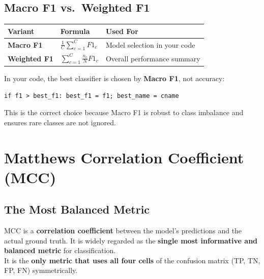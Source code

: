 \documentclass[12pt, a4paper]{article}
\begin{document}
\subsection{Macro F1 vs.\ Weighted F1}

\begin{center}
\begin{tabular}{lll}
\toprule
\textbf{Variant} & \textbf{Formula} & \textbf{Used For} \\
\midrule
\textbf{Macro F1} & $\frac{1}{C}\sum_{c=1}^{C} F1_c$ & Model selection in your code \\
\textbf{Weighted F1} & $\sum_{c=1}^{C} \frac{n_c}{N} F1_c$ & Overall performance summary \\
\bottomrule
\end{tabular}
\end{center}

\begin{keyidea}
In your code, the best classifier is chosen by \textbf{Macro F1}, not accuracy:
\begin{center}
\texttt{if f1 > best\_f1: best\_f1 = f1; best\_name = cname}
\end{center}
This is the correct choice because Macro F1 is robust to class imbalance and ensures rare classes are not ignored.
\end{keyidea}


\newpage
\section{Matthews Correlation Coefficient (MCC)}

\subsection{The Most Balanced Metric}

\begin{keyidea}
MCC is a \textbf{correlation coefficient} between the model's predictions and the actual ground truth. It is widely regarded as the \textbf{single most informative and balanced metric} for classification.\\[0.3cm]
It is the \textbf{only metric that uses all four cells} of the confusion matrix (TP, TN, FP, FN) symmetrically.
\end{keyidea}
\end{document}
